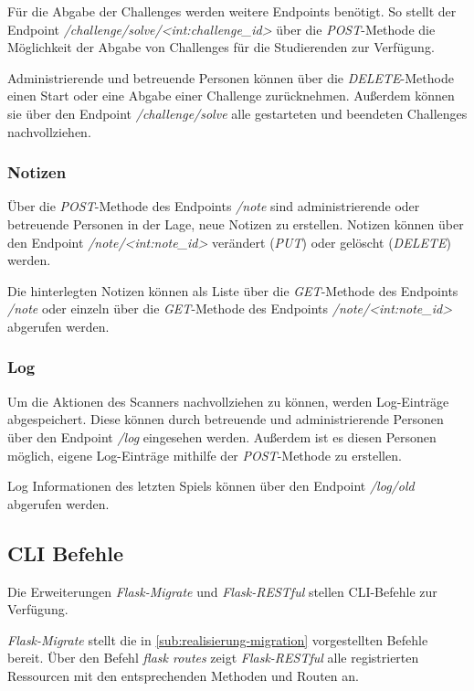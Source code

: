 Für die Abgabe der Challenges werden weitere Endpoints benötigt. So stellt der Endpoint \textit{/challenge/solve/<int:challenge\_id>} über die \textit{POST}-Methode die Möglichkeit der Abgabe von Challenges für die Studierenden zur Verfügung.

Administrierende und betreuende Personen können über die \textit{DELETE}-Methode einen Start oder eine Abgabe einer Challenge zurücknehmen. Außerdem können sie über den Endpoint \textit{/challenge/solve} alle gestarteten und beendeten Challenges nachvollziehen.

\subsubsection{Notizen}
Über die \textit{POST}-Methode des Endpoints \textit{/note} sind administrierende oder betreuende Personen in der Lage, neue Notizen zu erstellen. Notizen können über den Endpoint \textit{/note/<int:note\_id>} verändert (\textit{PUT}) oder gelöscht (\textit{DELETE}) werden.

Die hinterlegten Notizen können als Liste über die \textit{GET}-Methode des Endpoints \textit{/note} oder einzeln über die \textit{GET}-Methode des Endpoints \textit{/note/<int:note\_id>} abgerufen werden.

\subsubsection{Log}
Um die Aktionen des Scanners nachvollziehen zu können, werden Log-Einträge abgespeichert. Diese können durch betreuende und administrierende Personen über den Endpoint \textit{/log} eingesehen werden. Außerdem ist es diesen Personen möglich, eigene Log-Einträge mithilfe der \textit{POST}-Methode zu erstellen.

Log Informationen des letzten Spiels können über den Endpoint \textit{/log/old} abgerufen werden.
	
\subsection{CLI Befehle}
Die Erweiterungen \textit{Flask-Migrate} und \textit{Flask-RESTful} stellen CLI-Befehle zur Verfügung. 

\textit{Flask-Migrate} stellt die in \autoref{sub:realisierung-migration} vorgestellten Befehle bereit. Über den Befehl \textit{flask routes} zeigt \textit{Flask-RESTful} alle registrierten Ressourcen mit den entsprechenden \linebreak Methoden und Routen an.

